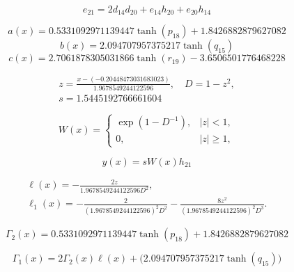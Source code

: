 \begin{equation}
e_{21}=2 d_{14} d_{20} + e_{14} h_{20} + e_{20} h_{14}
\end{equation}


\begin{equation}
a(x)=0.5331092971139447 \tanh{\left(p_{18} \right)} + 1.8426882879627082
\end{equation}
\begin{equation}
b(x)=2.094707957375217 \tanh{\left(q_{15} \right)}
\end{equation}
\begin{equation}
c(x)=2.7061878305031866 \tanh{\left(r_{19} \right)} - 3.6506501776468228
\end{equation}


\begin{equation}
\begin{aligned}z=\frac{x-(-0.20448473031683023)}{1.9678549244122596},\quad D=1-z^2,\\s=1.5445192766661604\end{aligned}
\end{equation}


\begin{equation}
W(x)=\begin{cases}\exp(1-D^{-1}),&|z|<1,\\0,&|z|\ge1,\end{cases}
\end{equation}


\begin{equation}\label{eq:ex6-solution}
y(x)=sW(x)h_{21}
\end{equation}


\begin{equation}
\begin{aligned}\ell(x)=-\frac{2z}{1.9678549244122596D^2},\\\ell_1(x)=-\frac{2}{(1.9678549244122596)^2D^2}-\frac{8z^2}{(1.9678549244122596)^2D^3}.\end{aligned}
\end{equation}


\begin{equation}
\Gamma_2(x)=0.5331092971139447 \tanh{\left(p_{18} \right)} + 1.8426882879627082
\end{equation}


\begin{equation}
\Gamma_1(x)=2\Gamma_2(x)\ell(x)+\bigl(2.094707957375217 \tanh{\left(q_{15} \right)}\bigr)
\end{equation}


